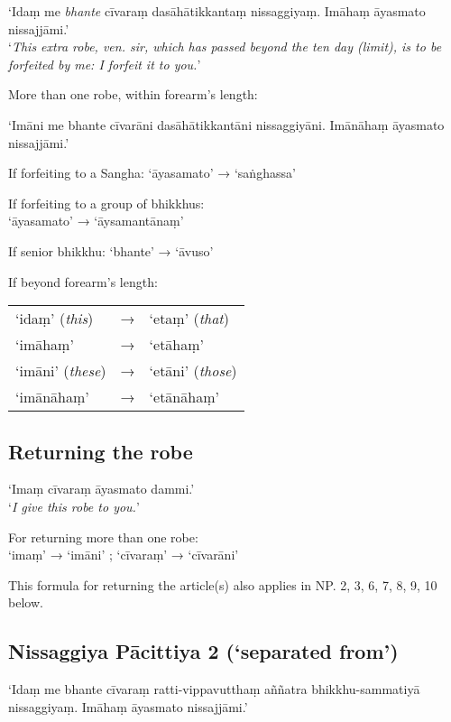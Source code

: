 ‘Idaṃ me \emph{bhante} cīvaraṃ dasāhātikkantaṃ nissaggiyaṃ. Imāhaṃ āyasmato nissajjāmi.’\\
‘\emph{This extra robe, ven. sir, which has passed beyond the ten day (limit), is
  to be forfeited by me: I forfeit it to you.}’

More than one robe, within forearm's length:

‘Imāni me bhante cīvarāni dasāhātikkantāni nissaggiyāni. Imānāhaṃ āyasmato nissajjāmi.’

If forfeiting to a Sangha: ‘āyasamato’ → ‘saṅghassa’ 

If forfeiting to a group of bhikkhus:\\
‘āyasamato’ → ‘āysamantānaṃ’

If senior bhikkhu: ‘bhante’ → ‘āvuso’

If beyond forearm's length:

\begin{tabular}{@{}lll@{}}
‘idaṃ’ (\emph{this}) & → & ‘etaṃ’ (\emph{that}) \\
‘imāhaṃ’             & → & ‘etāhaṃ’             \\
‘imāni’ (\emph{these}) & → & ‘etāni’ (\emph{those})\\
‘imānāhaṃ’             & → & ‘etānāhaṃ’\\
\end{tabular}


\vspace*{-\baselineskip}

\subsection{Returning the robe}
\label{np-1-returning-the-robe}

‘Imaṃ cīvaraṃ āyasmato dammi.’\\
‘\emph{I give this robe to you.}’ 

For returning more than one robe:\\
‘imaṃ’ → ‘imāni’ ; ‘cīvaraṃ’ → ‘cīvarāni’

This formula for returning the article(s) also applies in NP. 2, 3, 6, 7, 8, 9,
10 below.

\subsection{Nissaggiya Pācittiya 2 (‘separated from’)}

‘Idaṃ me bhante cīvaraṃ ratti-vippavutthaṃ aññatra bhikkhu-sammatiyā
nissaggiyaṃ. Imāhaṃ āyasmato nissajjāmi.’

